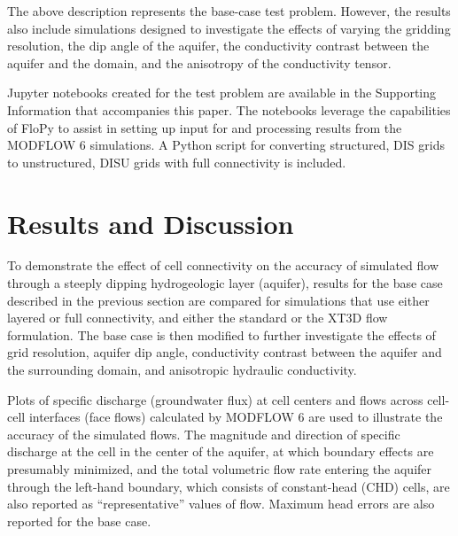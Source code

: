 \documentclass{article}
\begin{document}
The above description represents the base-case test problem. However, the results also include simulations designed to investigate the effects of varying the gridding resolution, the dip angle of the aquifer, the conductivity contrast between the aquifer and the domain, and the anisotropy of the conductivity tensor.

Jupyter notebooks created for the test problem are available in the Supporting Information that accompanies this paper. The notebooks leverage the capabilities of FloPy \citep{bakker2016scripting, hughes2023flopy} to assist in setting up input for and processing results from the MODFLOW 6 simulations. A Python script for converting structured, DIS grids to unstructured, DISU grids with full connectivity is included.

\section{Results and Discussion}

To demonstrate the effect of cell connectivity on the accuracy of simulated flow through a steeply dipping hydrogeologic layer (aquifer), results for the base case described in the previous section are compared for simulations that use either layered or full connectivity, and either the standard or the XT3D flow formulation. The base case is then modified to further investigate the effects of grid resolution, aquifer dip angle, conductivity contrast between the aquifer and the surrounding domain, and anisotropic hydraulic conductivity.

Plots of specific discharge (groundwater flux) at cell centers and flows across cell-cell interfaces (face flows) calculated by MODFLOW 6 are used to illustrate the accuracy of the simulated flows. The magnitude and direction of specific discharge at the cell in the center of the aquifer, at which boundary effects are presumably minimized, and the total volumetric flow rate entering the aquifer through the left-hand boundary, which consists of constant-head (CHD) cells, are also reported as ``representative'' values of flow. Maximum head errors are also reported for the base case.
\end{document}
